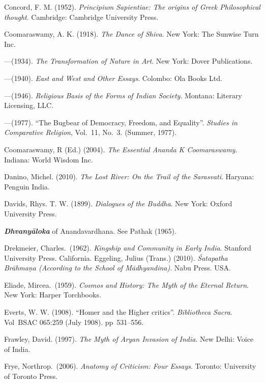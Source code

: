 \begin{thebibliography}{99}
Concord, F. M. (1952). {\sl Principium Sapientiae: The origins of Greek Philosophical thought}. Cambridge: Cambridge University Press. 

Coomaraswamy, A. K. (1918). {\sl The Dance of Shiva}. New York: The Sunwise Turn Inc. 

---\kern3pt(1934). {\sl The Transformation of Nature in Art}. New York: Dover Publications.

---\kern3pt(1940). {\sl East and West and Other Essays}. Colombo: Ola Books Ltd. 

---\kern3pt(1946). {\sl Religious Basis of the Forms of Indian Society}. Montana: Literary Licensing, LLC.

---\kern3pt(1977). “The Bugbear of Democracy, Freedom, and Equality”. {\sl Studies in Comparative Religion}, Vol.~11, No.~3. (Summer, 1977). 

Coomaraswamy, R (Ed.) (2004). {\sl The Essential Ananda K Coomaraswamy}. Indiana: World Wisdom Inc.

Danino, Michel. (2010). {\sl The Lost River: On the Trail of the Sarasvati}. Haryana: Penguin India.  

Davids, Rhys. T. W. (1899). {\sl Dialogues of the Buddha}. New York: Oxford University Press. 

{\sl\bfseries Dhvanyāloka} of Anandavardhana. See Pathak (1965).

Drekmeier, Charles.\ (1962). {\sl Kingship and Community in Early India}. Stanford University Press. California. Eggeling, Julius (Trans.) (2010). {\sl Śatapatha Brāhmaṇa (According to the School of Mādhyandina)}. Nabu Press. USA. 

Eliade, Mircea.\ (1959). {\sl Cosmos and History: The Myth of the Eternal Return}. New York: Harper Torchbooks. 

Everts, W. W. (1908). “Homer and the Higher critics”. {\sl Bibliotheca Sacra}. Vol BSAC 065:259 (July 1908). pp~531--556. 

Frawley, David. (1997). {\sl The Myth of Aryan Invasion of India}.  New Delhi: Voice of India. 

Frye, Northrop.\ (2006). {\sl Anatomy of Criticism: Four Essays}. Toronto: University of Toronto Press. 


\end{thebibliography}
